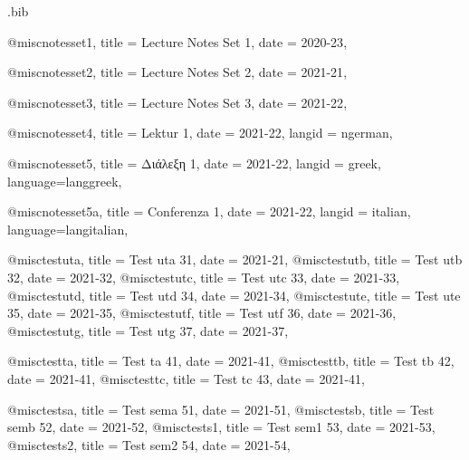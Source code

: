 

\begin{filecontents*}[overwrite]{\jobname.bib}

@misc{notesset1,
  title = {Lecture Notes Set 1}, 
  date = {2020-23},
	}

@misc{notesset2,
  title = {Lecture Notes Set 2}, 
  date = {2021-21},
	}

@misc{notesset3,
  title = {Lecture Notes Set 3}, 
  date = {2021-22},
	}	

@misc{notesset4,
  title = {Lektur 1}, 
  date = {2021-22},
  langid = {ngerman},
	}	


@misc{notesset5,
  title = {Διάλεξη 1}, 
  date = {2021-22},
  langid = {greek},
  language={langgreek},
	}	

@misc{notesset5a,
  title = {Conferenza 1}, 
  date = {2021-22},
  langid = {italian},
  language={langitalian},
	}	

@misc{testuta,
  title = {Test uta 31}, 
  date = {2021-21},
	}	
@misc{testutb,
  title = {Test utb 32}, 
  date = {2021-32},
	}	
@misc{testutc,
  title = {Test utc 33}, 
  date = {2021-33},
	}	
@misc{testutd,
  title = {Test utd 34}, 
  date = {2021-34},
	}	
@misc{testute,
  title = {Test ute 35}, 
  date = {2021-35},
	}	
@misc{testutf,
  title = {Test utf 36}, 
  date = {2021-36},
	}	
@misc{testutg,
  title = {Test utg 37}, 
  date = {2021-37},
	}	
	

@misc{testta,
  title = {Test ta 41}, 
  date = {2021-41},
	}	
@misc{testtb,
  title = {Test tb 42}, 
  date = {2021-41},
	}	
@misc{testtc,
  title = {Test tc 43}, 
  date = {2021-41},
	}	


@misc{testsa,
  title = {Test sema 51}, 
  date = {2021-51},
	}	
@misc{testsb,
  title = {Test semb 52}, 
  date = {2021-52},
	}	
@misc{tests1,
  title = {Test sem1 53}, 
  date = {2021-53},
	}	
@misc{tests2,
  title = {Test sem2 54}, 
  date = {2021-54},
	}	


\end{filecontents*}




\documentclass[12pt]{article}
\usepackage[english]{babel}
\usepackage{csquotes}
\usepackage[svgnames]{xcolor}
\usepackage{fontspec}
          [Color=DarkGreen ,
          ]{Noto Serif}

\usepackage[style=authoryear,
dateabbrev=false,%
language=autocite,%
autolang=other,%
]{biblatex}


